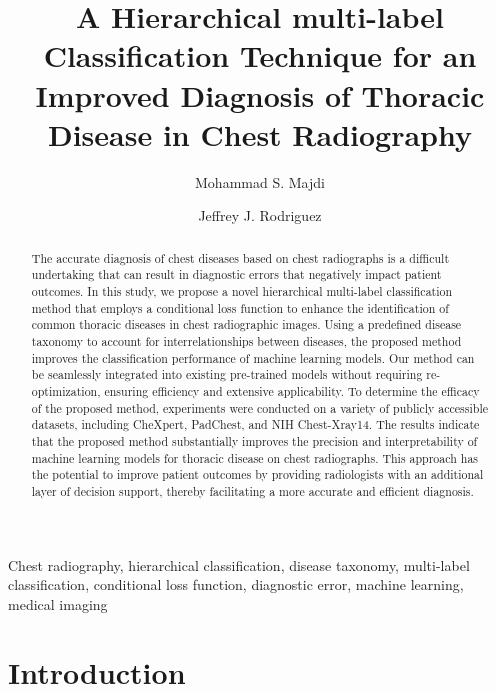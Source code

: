 \documentclass[preprint,3p,times, review]{elsarticle}
\begin{document}
\begin{frontmatter}

    \title{A Hierarchical multi-label Classification Technique for an Improved Diagnosis of Thoracic Disease in Chest Radiography}
    \author[label1]{Mohammad S. Majdi}
    \author[label1]{Jeffrey J. Rodriguez}

    \begin{abstract}
    The accurate diagnosis of chest diseases based on chest radiographs is a difficult undertaking that can result in diagnostic errors that negatively impact patient outcomes. In this study, we propose a novel hierarchical multi-label classification method that employs a conditional loss function to enhance the identification of common thoracic diseases in chest radiographic images. Using a predefined disease taxonomy to account for interrelationships between diseases, the proposed method improves the classification performance of machine learning models. Our method can be seamlessly integrated into existing pre-trained models without requiring re-optimization, ensuring efficiency and extensive applicability. To determine the efficacy of the proposed method, experiments were conducted on a variety of publicly accessible datasets, including CheXpert, PadChest, and NIH Chest-Xray14. The results indicate that the proposed method substantially improves the precision and interpretability of machine learning models for thoracic disease on chest radiographs. This approach has the potential to improve patient outcomes by providing radiologists with an additional layer of decision support, thereby facilitating a more accurate and efficient diagnosis.
    \end{abstract}

    \begin{keyword}
        Chest radiography, hierarchical classification, disease taxonomy, multi-label classification, conditional loss function, diagnostic error, machine learning, medical imaging
    \end{keyword}

\end{frontmatter}

% 

\section{Introduction}
\end{document}
